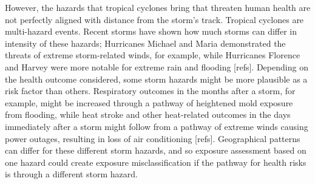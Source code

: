 However, the hazards that tropical cyclones bring that threaten human health
are not perfectly aligned with distance from the storm's track.  Tropical
cyclones are multi-hazard events. Recent storms have shown how much storms can
differ in intensity of these hazards; Hurricanes Michael and Maria demonstrated
the threats of extreme storm-related winds, for example, while Hurricanes
Florence and Harvey were more notable for extreme rain and flooding [refs].
Depending on the health outcome considered, some storm hazards might be more
plausible as a risk factor than others. Respiratory outcomes in the months
after a storm, for example, might be increased through a pathway of heightened
mold exposure from flooding, while heat stroke and other heat-related outcomes
in the days immediately after a storm might follow from a pathway of extreme
winds causing power outages, resulting in loss of air conditioning [refs].
Geographical patterns can differ for these different storm hazards, and so
exposure assessment based on one hazard could create exposure misclassification
if the pathway for health risks is through a different storm hazard.   


